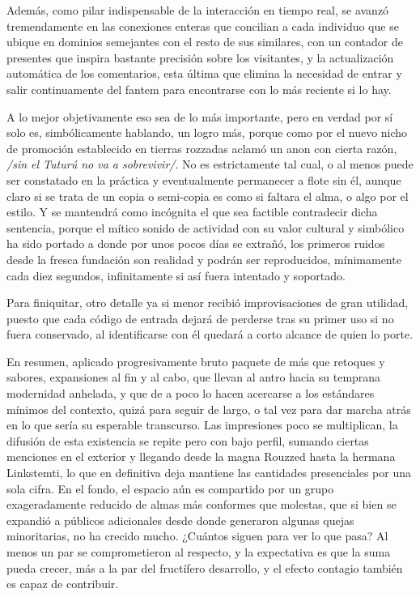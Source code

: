 \documentclass[
]{book}
\begin{document}
Además, como pilar indispensable de la interacción en tiempo real, se avanzó tremendamente en las conexiones enteras que concilian a cada individuo que se ubique en dominios semejantes con el resto de sus similares, con un contador de presentes que inspira bastante precisión sobre los visitantes, y la actualización automática de los comentarios, esta última que elimina la necesidad de entrar y salir continuamente del fantem para encontrarse con lo más reciente si lo hay.

A lo mejor objetivamente eso sea de lo más importante, pero en verdad por sí solo es, simbólicamente hablando, un logro más, porque como por el nuevo nicho de promoción establecido en tierras rozzadas aclamó un anon con cierta razón, \emph{/sin el Tuturú no va a sobrevivir/}. No es estrictamente tal cual, o al menos puede ser constatado en la práctica y eventualmente permanecer a flote sin él, aunque claro si se trata de un copia o semi-copia es como si faltara el alma, o algo por el estilo. Y se mantendrá como incógnita el que sea factible contradecir dicha sentencia, porque el mítico sonido de actividad con su valor cultural y simbólico ha sido portado a donde por unos pocos días se extrañó, los primeros ruidos desde la fresca fundación son realidad y podrán ser reproducidos, mínimamente cada diez segundos, infinitamente si así fuera intentado y soportado.

Para finiquitar, otro detalle ya si menor recibió improvisaciones de gran utilidad, puesto que cada código de entrada dejará de perderse tras su primer uso si no fuera conservado, al identificarse con él quedará a corto alcance de quien lo porte.

En resumen, aplicado progresivamente bruto paquete de más que retoques y sabores, expansiones al fin y al cabo, que llevan al antro hacia su temprana modernidad anhelada, y que de a poco lo hacen acercarse a los estándares mínimos del contexto, quizá para seguir de largo, o tal vez para dar marcha atrás en lo que sería su esperable transcurso. Las impresiones poco se multiplican, la difusión de esta existencia se repite pero con bajo perfil, sumando ciertas menciones en el exterior y llegando desde la magna Rouzzed hasta la hermana Linkstemti, lo que en definitiva deja mantiene las cantidades presenciales por una sola cifra. En el fondo, el espacio aún es compartido por un grupo exageradamente reducido de almas más conformes que molestas, que si bien se expandió a públicos adicionales desde donde generaron algunas quejas minoritarias, no ha crecido mucho. ¿Cuántos siguen para ver lo que pasa? Al menos un par se comprometieron al respecto, y la expectativa es que la suma pueda crecer, más a la par del fructífero desarrollo, y el efecto contagio también es capaz de contribuir.
\end{document}
